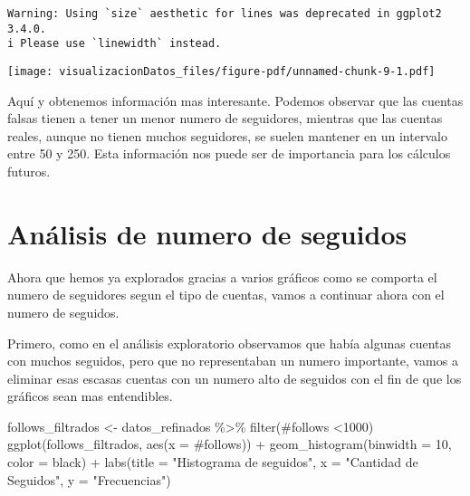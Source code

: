 \documentclass[
  letterpaper,
  DIV=11,
  numbers=noendperiod]{scrreprt}
\newenvironment{Shaded}{\begin{snugshade}}{\end{snugshade}}
\newcommand{\AttributeTok}[1]{\textcolor[rgb]{0.40,0.45,0.13}{#1}}
\newcommand{\DecValTok}[1]{\textcolor[rgb]{0.68,0.00,0.00}{#1}}
\newcommand{\FunctionTok}[1]{\textcolor[rgb]{0.28,0.35,0.67}{#1}}
\newcommand{\NormalTok}[1]{\textcolor[rgb]{0.00,0.23,0.31}{#1}}
\newcommand{\OtherTok}[1]{\textcolor[rgb]{0.00,0.23,0.31}{#1}}
\newcommand{\SpecialCharTok}[1]{\textcolor[rgb]{0.37,0.37,0.37}{#1}}
\newcommand{\StringTok}[1]{\textcolor[rgb]{0.13,0.47,0.30}{#1}}
\begin{document}
\begin{verbatim}
Warning: Using `size` aesthetic for lines was deprecated in ggplot2 3.4.0.
i Please use `linewidth` instead.
\end{verbatim}

\texttt{[image: visualizacionDatos\_files/figure-pdf/unnamed-chunk-9-1.pdf]}

Aquí y obtenemos información mas interesante. Podemos observar que las
cuentas falsas tienen a tener un menor numero de seguidores, mientras
que las cuentas reales, aunque no tienen muchos seguidores, se suelen
mantener en un intervalo entre 50 y 250. Esta información nos puede ser
de importancia para los cálculos futuros.

\section{Análisis de numero de
seguidos}\label{anuxe1lisis-de-numero-de-seguidos}

Ahora que hemos ya explorados gracias a varios gráficos como se comporta
el numero de seguidores segun el tipo de cuentas, vamos a continuar
ahora con el numero de seguidos.

Primero, como en el análisis exploratorio observamos que había algunas
cuentas con muchos seguidos, pero que no representaban un numero
importante, vamos a eliminar esas escasas cuentas con un numero alto de
seguidos con el fin de que los gráficos sean mas entendibles.

\begin{Shaded}
\begin{Highlighting}[]
\NormalTok{follows\_filtrados }\OtherTok{\textless{}{-}}\NormalTok{ datos\_refinados }\SpecialCharTok{\%\textgreater{}\%}  \FunctionTok{filter}\NormalTok{(}\StringTok{\textasciigrave{}}\AttributeTok{\#follows}\StringTok{\textasciigrave{}} \SpecialCharTok{\textless{}}\DecValTok{1000}\NormalTok{)  }
\FunctionTok{ggplot}\NormalTok{(follows\_filtrados, }\FunctionTok{aes}\NormalTok{(}\AttributeTok{x =} \StringTok{\textasciigrave{}}\AttributeTok{\#follows}\StringTok{\textasciigrave{}}\NormalTok{)) }\SpecialCharTok{+}   \FunctionTok{geom\_histogram}\NormalTok{(}\AttributeTok{binwidth =} \DecValTok{10}\NormalTok{, }\AttributeTok{color =} \StringTok{\textquotesingle{}black\textquotesingle{}}\NormalTok{) }\SpecialCharTok{+}     
  \FunctionTok{labs}\NormalTok{(}\AttributeTok{title =} \StringTok{"Histograma de seguidos"}\NormalTok{,        }
       \AttributeTok{x =} \StringTok{"Cantidad de Seguidos"}\NormalTok{,        }
       \AttributeTok{y =} \StringTok{"Frecuencias"}\NormalTok{)}
\end{Highlighting}
\end{Shaded}
\end{document}
